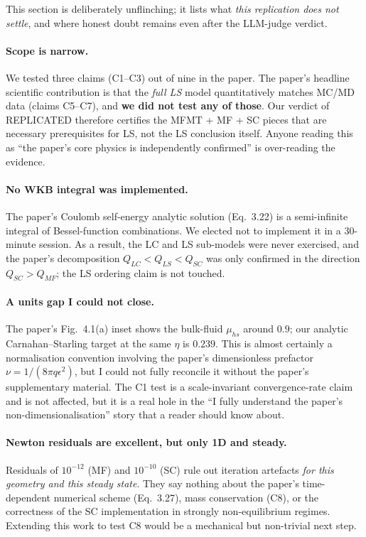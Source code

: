 \documentclass[11pt]{article}
\begin{document}
This section is deliberately unflinching; it lists what \emph{this
replication does not settle}, and where honest doubt remains even
after the LLM-judge verdict.

\paragraph{Scope is narrow.} We tested three claims (C1--C3) out of
nine in the paper. The paper's headline scientific contribution is
that the \emph{full LS} model quantitatively matches MC/MD data
(claims C5--C7), and \textbf{we did not test any of those}. Our
verdict of REPLICATED therefore certifies the MFMT + MF + SC pieces
that are necessary prerequisites for LS, not the LS conclusion
itself. Anyone reading this as ``the paper's core physics is
independently confirmed'' is over-reading the evidence.

\paragraph{No WKB integral was implemented.} The paper's Coulomb
self-energy analytic solution (Eq.~3.22) is a semi-infinite integral
of Bessel-function combinations. We elected not to implement it in a
30-minute session. As a result, the LC and LS sub-models were never
exercised, and the paper's decomposition
$Q_{LC}<Q_{LS}<Q_{SC}$ was only confirmed in the direction
$Q_{SC}>Q_{MF}$; the LS ordering claim is not touched.

\paragraph{A units gap I could not close.} The paper's Fig.~4.1(a)
inset shows the bulk-fluid $\mu_{hs}$ around $0.9$; our analytic
Carnahan--Starling target at the same $\eta$ is $0.239$. This is
almost certainly a normalisation convention involving the paper's
dimensionless prefactor $\nu=1/(8\pi q\epsilon^2)$, but I could not
fully reconcile it without the paper's supplementary material.
The C1 test is a scale-invariant convergence-rate claim and is not
affected, but it is a real hole in the ``I fully understand the
paper's non-dimensionalisation'' story that a reader should know
about.

\paragraph{Newton residuals are excellent, but only 1D and steady.}
Residuals of $10^{-12}$ (MF) and $10^{-10}$ (SC) rule out
iteration artefacts \emph{for this geometry and this steady state}.
They say nothing about the paper's time-dependent numerical scheme
(Eq.~3.27), mass conservation (C8), or the correctness of the SC
implementation in strongly non-equilibrium regimes. Extending this
work to test C8 would be a mechanical but non-trivial next step.
\end{document}

